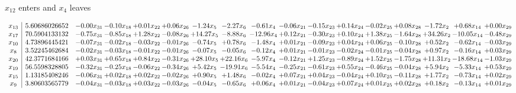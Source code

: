 \documentclass[9pt]{article}
\begin{document}
 $ x_{12} $ enters and $ x_{4} $ leaves 

 \[\begin{array}{c| c c@{\hskip 2pt} c@{\hskip 2pt} c@{\hskip 2pt} c@{\hskip 2pt} c@{\hskip 2pt} c@{\hskip 2pt} c@{\hskip 2pt} c@{\hskip 2pt} c@{\hskip 2pt} c@{\hskip 2pt} c@{\hskip 2pt} c@{\hskip 2pt} c@{\hskip 2pt} c@{\hskip 2pt} c@{\hskip 2pt} }
 x_{13}   &  5.60686026652 & -0.00 x_{31} & -0.10 x_{18} & +  0.01 x_{22} & +  0.06 x_{26} & -1.24 x_{5} & -2.27 x_{6} & -0.61 x_{4} & -0.06 x_{21} & -0.15 x_{23} & +  0.14 x_{24} & -0.02 x_{25} & +  0.08 x_{28} & -1.72 x_{2} & +  0.68 x_{14} & +  0.00 x_{29}\\
 x_{17}   &  70.5904133132 & -0.75 x_{31} & -0.85 x_{18} & +  1.28 x_{22} & -0.08 x_{26} & + 14.27 x_{5} & -8.88 x_{6} & -12.96 x_{4} & +  0.12 x_{21} & -0.30 x_{23} & +  0.10 x_{24} & +  1.38 x_{25} & -1.64 x_{28} & + 34.26 x_{2} & -10.05 x_{14} & -0.48 x_{29}\\
 x_{10}   &  4.73896445421 & -0.07 x_{31} & -0.02 x_{18} & -0.03 x_{22} & -0.01 x_{26} & -0.74 x_{5} & +  0.78 x_{6} & -1.48 x_{4} & +  0.01 x_{21} & -0.09 x_{23} & +  0.04 x_{24} & +  0.06 x_{25} & -0.10 x_{28} & +  0.52 x_{2} & -0.62 x_{14} & -0.03 x_{29}\\
 x_{8}   &  3.52245462684 & -0.02 x_{31} & -0.03 x_{18} & -0.01 x_{22} & -0.01 x_{26} & -0.07 x_{5} & -0.05 x_{6} & -0.12 x_{4} & +  0.01 x_{21} & -0.01 x_{23} & -0.02 x_{24} & -0.01 x_{25} & -0.04 x_{28} & +  0.97 x_{2} & -0.16 x_{14} & +  0.03 x_{29}\\
 x_{20}   &  42.3771684166 & +  0.03 x_{31} & +  0.65 x_{18} & +  0.84 x_{22} & -0.31 x_{26} & + 28.10 x_{5} & + 22.16 x_{6} & -5.97 x_{4} & -0.12 x_{21} & +  1.25 x_{23} & -0.89 x_{24} & +  1.52 x_{25} & -1.75 x_{28} & + 11.31 x_{2} & -18.68 x_{14} & -1.03 x_{29}\\
 x_{19}   &  56.5598328805 & -0.32 x_{31} & -0.25 x_{18} & -0.06 x_{22} & -0.34 x_{26} & +  5.42 x_{5} & -19.91 x_{6} & -5.54 x_{4} & -0.25 x_{21} & -0.61 x_{23} & +  0.55 x_{24} & -0.46 x_{25} & -0.04 x_{28} & +  5.94 x_{2} & -5.33 x_{14} & +  0.53 x_{29}\\
 x_{15}   &  1.13185408246 & -0.06 x_{31} & +  0.02 x_{18} & +  0.02 x_{22} & -0.02 x_{26} & +  0.90 x_{5} & +  1.48 x_{6} & -0.02 x_{4} & +  0.07 x_{21} & +  0.04 x_{23} & -0.04 x_{24} & +  0.10 x_{25} & -0.11 x_{28} & +  1.77 x_{2} & -0.73 x_{14} & +  0.02 x_{29}\\
 x_{9}   &  3.80603565779 & -0.04 x_{31} & -0.03 x_{18} & +  0.03 x_{22} & -0.03 x_{26} & -0.04 x_{5} & -0.65 x_{6} & +  0.06 x_{4} & +  0.01 x_{21} & -0.04 x_{23} & +  0.07 x_{24} & +  0.01 x_{25} & +  0.02 x_{28} & +  0.18 x_{2} & -0.13 x_{14} & +  0.01 x_{29}\\

\end{array}\]
\end{document}
